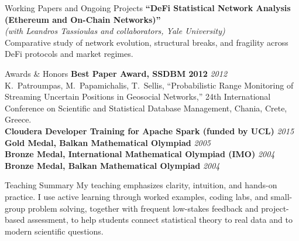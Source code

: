 \documentclass{resume}
\newcommand{\pubtitle}[1]{\textbf{``#1''}}
\begin{document}
\begin{rSection}{Working Papers and Ongoing Projects}
\pubtitle{DeFi Statistical Network Analysis (Ethereum and On-Chain Networks)}\\
\textit{(with Leandros Tassioulas and collaborators, Yale University)}\\
{\small Comparative study of network evolution, structural breaks, and fragility across DeFi protocols and market regimes.}

\end{rSection}

\begin{rSection}{Awards \& Honors}
{\bf Best Paper Award, SSDBM 2012} \hfill {\em 2012}\\
{\small K.\ Patroumpas, M.\ Papamichalis, T.\ Sellis, ``Probabilistic Range Monitoring of Streaming Uncertain Positions in Geosocial Networks,'' 24th International Conference on Scientific and Statistical Database Management, Chania, Crete, Greece.}\\
{\bf Cloudera Developer Training for Apache Spark (funded by UCL)} \hfill {\em 2015}\\
{\bf Gold Medal, Balkan Mathematical Olympiad} \hfill {\em 2005}\\
{\bf Bronze Medal, International Mathematical Olympiad (IMO)} \hfill {\em 2004}\\
{\bf Bronze Medal, Balkan Mathematical Olympiad} \hfill {\em 2004}
\end{rSection}

\begin{rSection}{Teaching Summary}
My teaching emphasizes clarity, intuition, and hands-on practice. I use active learning through worked examples, coding labs, and small-group problem solving, together with frequent low-stakes feedback and project-based assessment, to help students connect statistical theory to real data and to modern scientific questions.
\end{rSection}
\end{document}
